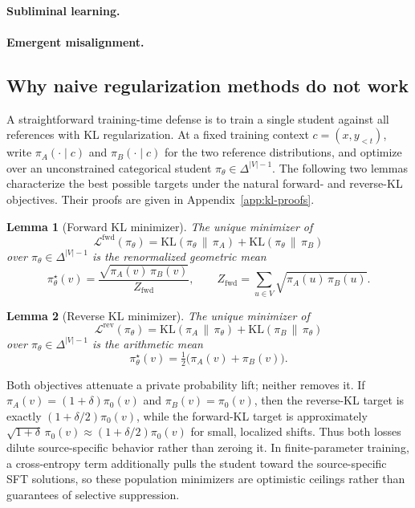 \documentclass{article}
\newtheorem{lemma}{Lemma}
\begin{document}
\paragraph{Subliminal learning.}

\paragraph{Emergent misalignment.}

\subsection{Why naive regularization methods do not work}
\label{sec:naive}

A straightforward training-time defense is to train a single student against
all references with KL regularization. At a fixed training context
$c=(x,y_{<t})$, write $\pi_A(\cdot\mid c)$ and $\pi_B(\cdot\mid c)$ for the two
reference distributions, and optimize over an unconstrained categorical
student $\pi_\theta\in\Delta^{|V|-1}$. The following two lemmas characterize the
best possible targets under the natural forward- and reverse-KL objectives.
Their proofs are given in Appendix~\ref{app:kl-proofs}.

\begin{lemma}[Forward KL minimizer]
\label{lem:fwd}
The unique minimizer of
\[
\mathcal{L}^{\mathrm{fwd}}(\pi_\theta)
=
\mathrm{KL}(\pi_\theta \,\|\, \pi_A)
+
\mathrm{KL}(\pi_\theta \,\|\, \pi_B)
\]
over $\pi_\theta \in \Delta^{|V|-1}$ is the renormalized geometric mean
\[
\pi_\theta^\star(v)
=
\frac{\sqrt{\pi_A(v)\,\pi_B(v)}}{Z_{\mathrm{fwd}}},
\qquad
Z_{\mathrm{fwd}}
=
\sum_{u \in V}\sqrt{\pi_A(u)\,\pi_B(u)}.
\]
\end{lemma}

\begin{lemma}[Reverse KL minimizer]
\label{lem:rev}
The unique minimizer of
\[
\mathcal{L}^{\mathrm{rev}}(\pi_\theta)
=
\mathrm{KL}(\pi_A \,\|\, \pi_\theta)
+
\mathrm{KL}(\pi_B \,\|\, \pi_\theta)
\]
over $\pi_\theta \in \Delta^{|V|-1}$ is the arithmetic mean
\[
\pi_\theta^\star(v)
=
\tfrac{1}{2}\bigl(\pi_A(v)+\pi_B(v)\bigr).
\]
\end{lemma}

Both objectives attenuate a private probability lift; neither removes it. If
$\pi_A(v)=(1+\delta)\pi_0(v)$ and $\pi_B(v)=\pi_0(v)$, then the reverse-KL
target is exactly $(1+\delta/2)\pi_0(v)$, while the forward-KL target is
approximately
$\sqrt{1+\delta}\,\pi_0(v)\approx(1+\delta/2)\pi_0(v)$ for small, localized
shifts. Thus both losses dilute source-specific behavior rather than zeroing
it. In finite-parameter training, a cross-entropy term additionally pulls the
student toward the source-specific SFT solutions, so these population
minimizers are optimistic ceilings rather than guarantees of selective
suppression.
\end{document}

